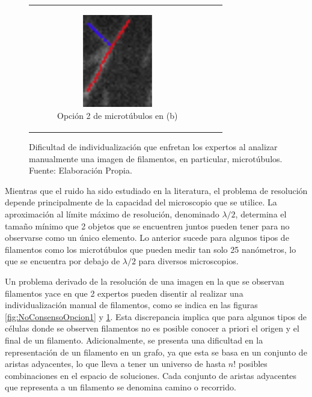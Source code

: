 \begin{figure}[h]
\begin{tabular}{c c c}
        \begin{subfigure}[t]{0.3\textwidth}
            \centering
            \includegraphics[height=1.6in]{imagenes/NoConsenso4.png}
            \caption{Opci\'on 2 de microt\'ubulos en (b)}
            \label{fig:NoConsensoOpcion2}
        \end{subfigure}
    \end{tabular}
    
    \caption[Dificultad de individualizaci\'on que enfretan los expertos al analizar manualmente una imagen de filamentos.]{Dificultad de individualizaci\'on que enfretan los expertos al analizar manualmente una imagen de filamentos, en particular, microt\'ubulos. Fuente: Elaboraci\'on Propia.}
    \label{fig:NoConsenso}
\end{figure}

Mientras que el ruido ha sido estudiado en la literatura, el problema de resoluci\'on depende principalmente de la capacidad del microscopio que se utilice. La aproximaci\'on al l\'imite m\'aximo de resoluci\'on, denominado $\lambda/2$, determina el tama\~no m\'inimo que 2 objetos que se encuentren juntos pueden tener para no observarse como un \'unico elemento. Lo anterior sucede para algunos tipos de filamentos como los microt\'ubulos que pueden medir tan solo 25 nan\'ometros, lo que se encuentra por debajo de $\lambda/2$ para diversos microscopios.


Un problema derivado de la resoluci\'on de una imagen en la que se observan filamentos yace en que 2 expertos pueden disentir al realizar una individualizaci\'on manual de filamentos, como se indica en las figuras \ref{fig:NoConsensoOpcion1} y \ref{fig:NoConsensoOpcion2}. Esta discrepancia implica que para algunos tipos de c\'elulas donde se observen filamentos no es posible conocer a priori el origen y el final de un filamento. Adicionalmente, se presenta una dificultad en la representaci\'on de un filamento en un grafo, ya que esta se basa en un conjunto de aristas adyacentes, lo que lleva a tener un universo de hasta $n!$ posibles combinaciones en el espacio de soluciones. Cada conjunto de aristas adyacentes que representa a un filamento se denomina camino o recorrido.


